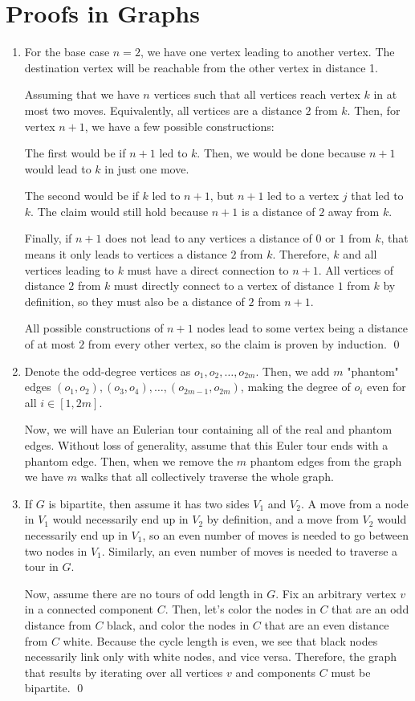 \documentclass{article}
\begin{document}
	\section{Proofs in Graphs}
	\begin{enumerate}[label=\alph*.]
		\item For the base case $n=2$, we have one vertex leading to another vertex. The 
		destination vertex will be reachable from the other vertex in distance 1.

		Assuming that we have $n$ vertices such that all vertices reach vertex $k$ in 
		at most two moves. Equivalently, all vertices are a distance $2$ from $k$.
		Then, for vertex $n+1$, we have a few possible constructions:

		The first would be if $n+1$ led to $k$. Then, we would be done because $n+1$ 
		would lead to $k$ in just one move. 

		The second would be if $k$ led to $n+1$, but $n+1$ led to a vertex $j$ that led to $k$.
		The claim would still hold because $n+1$ is a distance of $2$ away from $k$.
		
		Finally, if $n+1$ does not lead to any vertices a distance of $0$ or $1$ from $k$, that 
		means it only leads to vertices a distance $2$ from $k$. Therefore, $k$ and all vertices 
		leading to $k$ must have a direct connection to $n+1$. All vertices of distance $2$ from $k$
		must directly connect to a vertex of distance $1$ from $k$ by definition, so they must 
		also be a distance of $2$ from $n+1$.
		
		All possible constructions of $n+1$ nodes lead to some vertex being a distance of at most $2$ 
		from every other vertex, so the claim is proven by induction. \qed
		\item Denote the odd-degree vertices as $o_1, o_2, \ldots, o_{2m}$. Then, we add $m$ 
		"phantom" edges $(o_1, o_2), (o_3, o_4), \ldots, (o_{2m-1}, o_{2m})$, making the degree
		of $o_i$ even for all $i \in [1, 2m]$. 

		Now, we will have an Eulerian tour containing all of the real and phantom edges. Without
		loss of generality, assume that this Euler tour ends with a phantom edge. Then, when 
		we remove the $m$ phantom edges from the graph we have $m$ walks that all collectively
		traverse the whole graph.
		\item If $G$ is bipartite, then assume it has two sides $V_1$ and $V_2$. A move from 
		a node in $V_1$ would necessarily end up in $V_2$ by definition, and a move from $V_2$ 
		would necessarily end up in $V_1$, so an even number of moves is needed to go between 
		two nodes in $V_1$. Similarly, an even number of moves is needed to traverse a tour in $G$.

		Now, assume there are no tours of odd length in $G$. Fix an arbitrary vertex $v$ in a 
		connected component $C$. Then, let's color the nodes in $C$ that are an odd distance from $C$ 
		black, and color the nodes in $C$ that are an even distance from $C$ white. Because 
		the cycle length is even, we see that black nodes necessarily link only with white nodes, 
		and vice versa. Therefore, the graph that results by iterating over all vertices $v$ and 
		components $C$ must be bipartite. \qed
	\end{enumerate}
\end{document}
